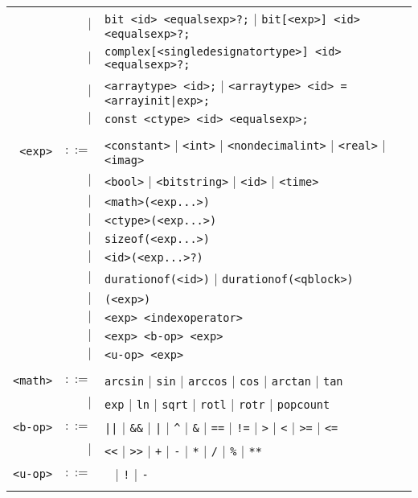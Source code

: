 \documentclass[notitlepage]{article}
\begin{document}
\begin{longtable}{rrl}
	    & $\mid$ & \texttt{bit <id> <equalsexp>?;} $\mid$ \texttt{bit[<exp>] <id> <equalsexp>?;} \\
	    & $\mid$ & \texttt{complex[<singledesignatortype>] <id> <equalsexp>?;} \\
	    & $\mid$ & \texttt{<arraytype> <id>;} $\mid$ \texttt{<arraytype> <id> = <arrayinit|exp>;} \\
	    & $\mid$ & \texttt{const <ctype> <id> <equalsexp>;} \\ \\
	\texttt{<exp>} & $::=$ & \texttt{<constant>} $\mid$ \texttt{<int>} $\mid$ \texttt{<nondecimalint>} $\mid$ \texttt{<real>} $\mid$ \texttt{<imag>} \\
	    & $\mid$ & \texttt{<bool>} $\mid$ \texttt{<bitstring>} $\mid$ \texttt{<id>} $\mid$ \texttt{<time>} \\
	    & $\mid$ & \texttt{<math>(<exp...>)} \\
	    & $\mid$ & \texttt{<ctype>(<exp...>)} \\
	    & $\mid$ & \texttt{sizeof(<exp...>)} \\
	    & $\mid$ & \texttt{<id>(<exp...>?)} \\
	    & $\mid$ & \texttt{durationof(<id>)} $\mid$ \texttt{durationof(<qblock>)}\\
	    & $\mid$ & \texttt{(<exp>)} \\
	    & $\mid$ & \texttt{<exp> <indexoperator>} \\
	    & $\mid$ & \texttt{<exp> <b-op> <exp>} \\
	    & $\mid$ & \texttt{<u-op> <exp>} \\
	    \\
	\texttt{<math>} & $::=$ & \texttt{arcsin} $\mid$ \texttt{sin} $\mid$ \texttt{arccos} $\mid$ \texttt{cos} $\mid$ \texttt{arctan} $\mid$ \texttt{tan} \\
	    & $\mid$ & \texttt{exp} $\mid$ \texttt{ln}  $\mid$ \texttt{sqrt} $\mid$ \texttt{rotl} $\mid$ \texttt{rotr} $\mid$ \texttt{popcount} \\
	\texttt{<b-op>} & $::=$ & \texttt{||} $\mid$ \texttt{\&\&} $\mid$ \texttt{|} $\mid$ \texttt{\string^} $\mid$ \texttt{\&}  $\mid$ \texttt{==} $\mid$ \texttt{!=} $\mid$ \texttt{>} $\mid$ \texttt{<} $\mid$ \texttt{>=} $\mid$ \texttt{<=} \\
	    & $\mid$ & \texttt{<{}<} $\mid$ \texttt{>{}>} $\mid$ \texttt{+} $\mid$ \texttt{-} $\mid$ \texttt{*} $\mid$ \texttt{/} $\mid$ \texttt{\%} $\mid$ \texttt{**} \\
	\texttt{<u-op>} & $::=$ & \texttt{\string~} $\mid$ \texttt{!} $\mid$ \texttt{-} \\ \\

\end{longtable}
\end{document}
